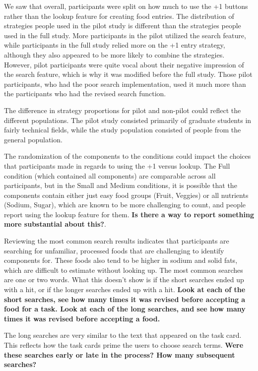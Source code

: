 We saw that overall, participants were split on how much to use the +1 buttons rather than the lookup feature for creating food entries. The distribution of strategies people used in the pilot study is different than the strategies people used in the full study. More participants in the pilot utilized the search feature, while participants in the full study relied more on the +1 entry strategy, although they also appeared to be more likely to combine the strategies. However, pilot participants were quite vocal about their negative impression of the search feature, which is why it was modified before the full study. Those pilot participants, who had the poor search implementation, used it much more than the participants who had the revised search function. 

The difference in strategy proportions for pilot and non-pilot could reflect the different populations. The pilot study consisted primarily of graduate students in fairly technical fields, while the study population consisted of people from the general population. 

The randomization of the components to the conditions could impact the choices that participants made in regards to using the +1 versus lookup. The Full condition (which contained all components) are comparable across all participants, but in the Small and Medium conditions, it is possible that the components contain either just easy food groups (Fruit, Veggies) or all nutrients (Sodium, Sugar), which are known to be more challenging to count, and people report using the lookup feature for them. \textbf{Is there a way to report something more substantial about this?}. 

Reviewing the most common search results indicates that participants are searching for unfamiliar, processed foods that are challenging to identify components for. These foods also tend to be higher in sodium and solid fats, which are difficult to estimate without looking up. The most common searches are one or two words. What this doesn't show is if the short searches ended up with a hit, or if the longer searches ended up with a hit. \textbf{Look at each of the short searches, see how many times it was revised before accepting a food for a task. Look at each of the long searches, and see how many times it was revised before accepting a food. } 

The long searches are very similar to the text that appeared on the task card. This reflects how the task cards prime the users to choose search terms. \textbf{Were these searches early or late in the process? How many subsequent searches?}

